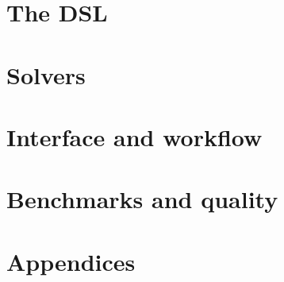 \part{The DSL}
\label{part:dsl_en}



\part{Solvers}
\label{part:solver_en}











\part{Interface and workflow}
\label{part:ui_en}





\part{Benchmarks and quality}
\label{part:benchmark_en}



\appendix
\part{Appendices}
\label{part:appendici_en}








\backmatter

\printbibliography[heading=bibintoc, title={Bibliography}]

\printindex


